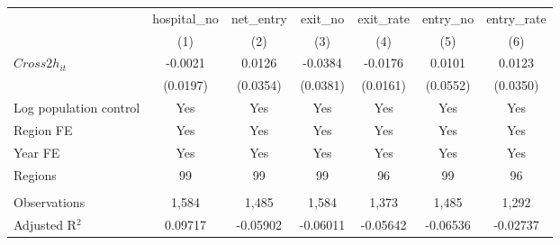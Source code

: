 \begingroup
\centering
\begin{tabular}{lcccccc}
   \toprule
                          & hospital\_no  & net\_entry  & exit\_no  & exit\_rate  & entry\_no  & entry\_rate \\    
                          & (1)           & (2)         & (3)       & (4)         & (5)        & (6)\\  
   \midrule 
   $Cross2h_{it}$         & -0.0021       & 0.0126      & -0.0384   & -0.0176     & 0.0101     & 0.0123\\   
                          & (0.0197)      & (0.0354)    & (0.0381)  & (0.0161)    & (0.0552)   & (0.0350)\\   
   Log population control & Yes           & Yes         & Yes       & Yes         & Yes        & Yes\\  
   Region FE              & Yes           & Yes         & Yes       & Yes         & Yes        & Yes\\  
   Year FE                & Yes           & Yes         & Yes       & Yes         & Yes        & Yes\\  
   Regions                & 99            & 99          & 99        & 96          & 99         & 96\\  
    \\
   Observations           & 1,584         & 1,485       & 1,584     & 1,373       & 1,485      & 1,292\\  
   Adjusted R$^2$         & 0.09717       & -0.05902    & -0.06011  & -0.05642    & -0.06536   & -0.02737\\  
   \bottomrule
\end{tabular}
\par\endgroup
